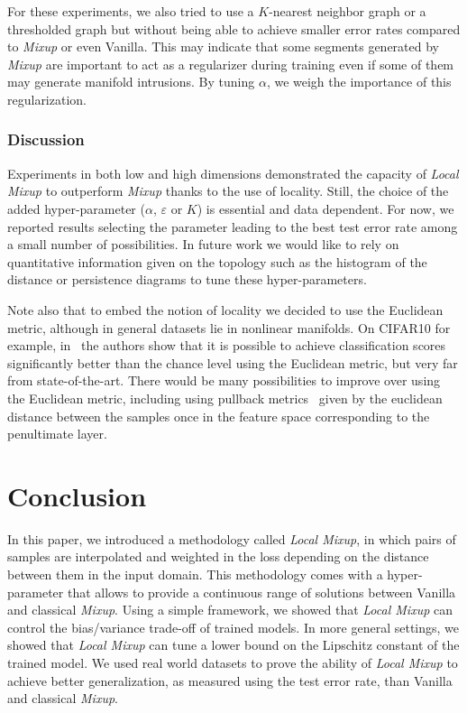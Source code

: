 \documentclass[twoside]{article}
\numberwithin{intassumption}{assumption}
\begin{document}
For these experiments, we also tried to use a $K$-nearest neighbor graph or a thresholded graph but without being able to achieve smaller error rates compared to \emph{Mixup} or even Vanilla. This may indicate that some segments generated by \emph{Mixup} are important to act as a regularizer during training even if some of them may generate manifold intrusions. By tuning $\alpha$, we weigh the importance of this regularization.

\subsubsection{Discussion}
Experiments in both low and high dimensions demonstrated the capacity of \emph{Local Mixup} to outperform \emph{Mixup} thanks to the use of locality. 
Still, the choice of the added hyper-parameter ($\alpha$, $\varepsilon$ or $K$) is essential and data dependent. For now, we reported results selecting the parameter leading to the best test error rate among a small number of possibilities. In future work we would like to rely on quantitative information given on the topology such as the histogram of the distance or persistence diagrams\citep{topologicaldatanalysis} to tune these hyper-parameters.

Note also that to embed the notion of locality we decided to use the Euclidean metric, although in general datasets lie in nonlinear manifolds. On CIFAR10 for example, in~\citep{KnearestMixup} the authors show that it is possible to achieve classification scores significantly better than the chance level using the Euclidean metric, but very far from state-of-the-art. There would be many possibilities to improve over using the Euclidean metric, including using pullback metrics~\citep{pullback,pullbacklatent} given by the euclidean distance between the samples once in the feature space corresponding to the penultimate layer.

\section{Conclusion}

In this paper, we introduced a methodology called \emph{Local Mixup}, in which pairs of samples are interpolated and weighted in the loss depending on the distance between them in the input domain.
This methodology comes with a hyper-parameter that allows to provide a continuous range of solutions between Vanilla and classical \emph{Mixup}.
Using a simple framework, we showed that \emph{Local Mixup} can control the bias/variance trade-off of trained models. In more general settings, we showed that \emph{Local Mixup} can tune a lower bound on the Lipschitz constant of the trained model.
We used real world datasets to prove the ability of \emph{Local Mixup} to achieve better generalization, as measured using the test error rate, than Vanilla and classical \emph{Mixup}.
\end{document}
